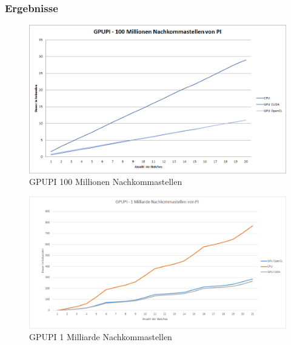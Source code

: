 \subsubsection{Ergebnisse}

\begin{figure}[!h]
	\begin{center}
		\includegraphics[width=1.0\linewidth]{images/GPUPI_100M.png}
		\caption{GPUPI 100 Millionen Nachkommastellen}
		\label{GPUPI_100M}
	\end{center}
\end{figure}

\begin{figure}[!h]
	\begin{center}
		\includegraphics[width=1.0\linewidth]{images/GPUPI_1B.png}
		\caption{GPUPI 1 Milliarde Nachkommastellen}
		\label{GPUPI_1B}
	\end{center}
\end{figure}

